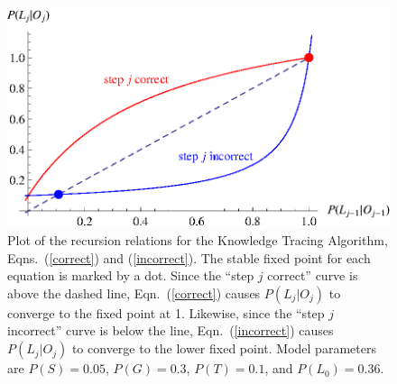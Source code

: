 \documentclass{acmlarge-edm}
\begin{document}
\begin{figure}
\centering\includegraphics{p-recursion.eps}
\caption{
  Plot of the recursion relations for the Knowledge Tracing Algorithm, 
  Eqns.~(\ref{correct}) and (\ref{incorrect}).
  The stable fixed point for each equation is marked
  by a dot.  Since the ``step $j$ correct'' curve is above the
  dashed line, Eqn.~(\ref{correct}) causes $P(L_j|O_j)$ to converge to
  the fixed point at 1.  Likewise, since the ``step $j$ incorrect''
  curve is below the line, Eqn.~(\ref{incorrect}) causes $P(L_j|O_j)$
  to converge to the lower fixed point.
  Model parameters are $P(S)=0.05$, $P(G)=0.3$,  $P(T)=0.1$, and $P(L_0)=0.36$.
 }
 \label{p-recursion}
\end{figure}
\end{document}
